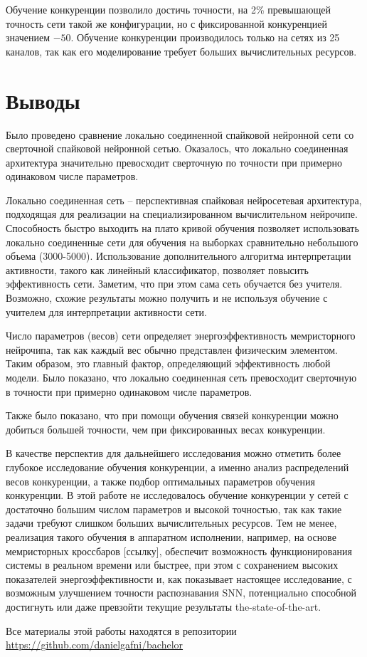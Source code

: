 \documentclass[a4paper]{article}
\begin{document}
Обучение конкуренции позволило достичь точности, на 2\% превышающей точность сети такой же конфигурации, но с фиксированной конкуренцией значением $-50$. Обучение конкуренции производилось только на сетях из 25 каналов, так как его моделирование требует больших вычислительных ресурсов.


\section*{Выводы}
Было проведено сравнение локально соединенной спайковой нейронной сети со сверточной спайковой нейронной сетью. Оказалось, что локально соединенная архитектура значительно превосходит сверточную по точности при примерно одинаковом числе параметров.

Локально соединенная сеть – перспективная спайковая нейросетевая архитектура, подходящая для реализации на специализированном вычислительном нейрочипе. Способность быстро выходить на плато кривой обучения позволяет использовать локально соединенные сети для обучения на выборках сравнительно небольшого объема (3000-5000). Использование дополнительного алгоритма интерпретации активности, такого как линейный классификатор, позволяет повысить эффективность сети. Заметим, что при этом сама сеть обучается без учителя. Возможно, схожие результаты можно получить и не используя обучение с учителем для интерпретации активности сети.

Число параметров (весов) сети определяет энергоэффективность мемристорного нейрочипа, так как каждый вес обычно представлен физическим элементом. Таким образом, это главный фактор, определяющий эффективность любой модели. Было показано, что локально соединенная сеть превосходит сверточную в точности при примерно одинаковом числе параметров.

Также было показано, что при помощи обучения связей конкуренции можно добиться большей точности, чем при фиксированных весах конкуренции.

В качестве перспектив для дальнейшего исследования можно отметить более глубокое исследование обучения конкуренции, а именно анализ распределений весов конкуренции, а также подбор оптимальных параметров обучения конкуренции. В этой работе не исследовалось обучение конкуренции у сетей с достаточно большим числом параметров и высокой точностью, так как такие задачи требуют слишком больших вычислительных ресурсов. Тем не менее, реализация такого обучения в аппаратном исполнении, например, на основе мемристорных кроссбаров [ссылку], обеспечит возможность функционирования системы в реальном времени или быстрее, при этом с сохранением высоких показателей энергоэффективности и, как показывает настоящее исследование, с возможным улучшением точности распознавания SNN, потенциально способной достигнуть или даже превзойти текущие результаты the-state-of-the-art.

\clearpage 

\printbibliography[sorting=none,heading=bibintoc,type=article,title={Литература}]
 
\begin{center}
Все материалы этой работы находятся в репозитории\\
\href{https://github.com/danielgafni/bachelor}{https://github.com/danielgafni/bachelor} 
\end{center}
\end{document}
